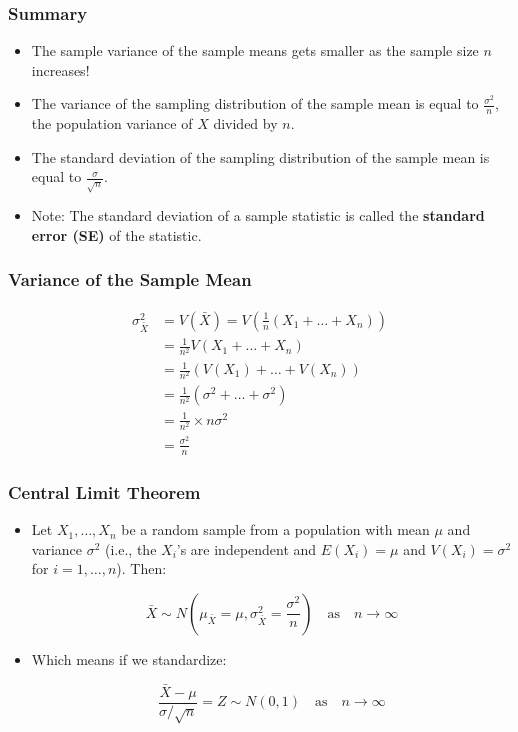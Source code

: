 \documentclass[12pt]{beamer}
\begin{document}
\begin{frame}
	\frametitle{Summary}
	
	\begin{itemize}[label={\color{blue}$\blacktriangleright$}]
		\item The sample variance of the sample means gets smaller as the sample size $n$ increases!
		
		\item The variance of the sampling distribution of the sample mean is equal to $\frac{\sigma^2}{n}$, the population variance of $X$ divided by $n$.
		
		\item The standard deviation of the sampling distribution of the sample mean is equal to $\frac{\sigma}{\sqrt{n}}$.
		
		\item Note: The standard deviation of a sample statistic is called the \textbf{standard error (SE)} of the statistic.
	\end{itemize}
	
\end{frame}
\begin{frame}
	\frametitle{Variance of the Sample Mean}
	
	\begin{align*}
		\sigma^2_{\bar{X}} &= V(\bar{X}) = V\left(\frac{1}{n}(X_1 + \ldots + X_n)\right) \\[0.5em]
		&= \frac{1}{n^2}V(X_1 + \ldots + X_n) \\[0.5em]
		&= \frac{1}{n^2}(V(X_1) + \ldots + V(X_n)) \\[0.5em]
		&= \frac{1}{n^2}(\sigma^2 + \ldots + \sigma^2) \\[0.5em]
		&= \frac{1}{n^2} \times n\sigma^2 \\[0.5em]
		&= \frac{\sigma^2}{n}
	\end{align*}
	
\end{frame}
\begin{frame}
	\frametitle{Central Limit Theorem}
	
	\begin{itemize}[label={\color{blue}$\blacktriangleright$}]
		\item Let $X_1, \ldots, X_n$ be a random sample from a population with mean $\mu$ and variance $\sigma^2$ (i.e., the $X_i$'s are independent and $E(X_i) = \mu$ and $V(X_i) = \sigma^2$ for $i = 1, \ldots, n$). Then:
		
		\vspace{0.5em}
		
		\[\bar{X} \sim N\left(\mu_{\bar{X}} = \mu, \sigma^2_{\bar{X}} = \frac{\sigma^2}{n}\right) \quad \text{as} \quad n \to \infty\]
		
		\vspace{0.5em}
		
		\item Which means if we standardize:
		
		\vspace{0.5em}
		
		\[\frac{\bar{X} - \mu}{\sigma / \sqrt{n}} = Z \sim N(0, 1) \quad \text{as} \quad n \to \infty\]
	\end{itemize}
	
\end{frame}
\end{document}

